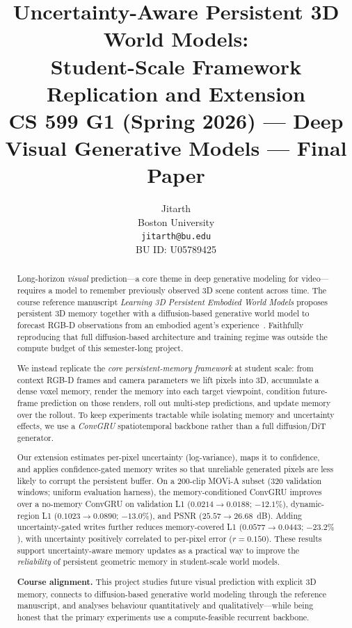 \documentclass[11pt]{article}
\title{Uncertainty-Aware Persistent 3D World Models: \\
Student-Scale Framework Replication and Extension\\
\large CS 599 G1 (Spring 2026) --- Deep Visual Generative Models --- Final Paper}
\author{Jitarth \\
Boston University \\
\texttt{jitarth@bu.edu} \\
BU ID: U05789425}
\date{}
\begin{document}
\maketitle

\begin{abstract}
Long-horizon \emph{visual} prediction---a core theme in deep generative modeling for video---requires
a model to remember previously observed 3D scene content across time.
The course reference manuscript \emph{Learning 3D Persistent Embodied World Models} proposes persistent
3D memory together with a diffusion-based generative world model to forecast RGB-D observations from an
embodied agent's experience~\cite{persistent3dworld}.
Faithfully reproducing that full diffusion-based architecture and training regime was outside the compute
budget of this semester-long project.

We instead replicate the \emph{core persistent-memory framework} at student scale:
from context RGB-D frames and camera parameters we lift pixels into 3D, accumulate a dense voxel memory,
render the memory into each target viewpoint, condition future-frame prediction on those renders, roll out
multi-step predictions, and update memory over the rollout.
To keep experiments tractable while isolating memory and uncertainty effects, we use a
\emph{ConvGRU} spatiotemporal backbone rather than a full diffusion/DiT generator.

Our extension estimates per-pixel uncertainty (log-variance), maps it to confidence, and applies
confidence-gated memory writes so that unreliable generated pixels are less likely to corrupt the
persistent buffer.
On a $200$-clip MOVi-A subset ($320$ validation windows; uniform evaluation harness), the
memory-conditioned ConvGRU improves over a no-memory ConvGRU on validation L1
($0.0214\!\rightarrow\!0.0188$; $-12.1\%$),
dynamic-region L1 ($0.1023\!\rightarrow\!0.0890$; $-13.0\%$),
and PSNR ($25.57\!\rightarrow\!26.68$~dB).
Adding uncertainty-gated writes further reduces memory-covered L1
($0.0577\!\rightarrow\!0.0443$; $-23.2\%$),
with uncertainty positively correlated to per-pixel error ($r{=}0.150$).
These results support uncertainty-aware memory updates as a practical way to improve the \emph{reliability}
of persistent geometric memory in student-scale world models.

\medskip
\noindent\textbf{Course alignment.}
This project studies future visual prediction with explicit 3D memory, connects to diffusion-based
generative world modeling through the reference manuscript, and analyses behaviour quantitatively and
qualitatively---while being honest that the primary experiments use a compute-feasible recurrent backbone.
\end{abstract}
\end{document}
